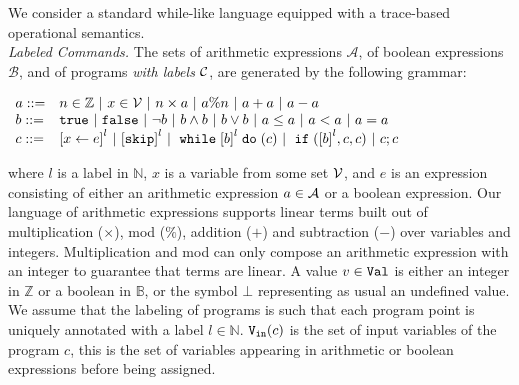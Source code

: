 We consider a standard while-like language equipped with a trace-based operational semantics.\\

\noindent\emph{Labeled Commands.}
The sets of arithmetic expressions $\mathcal{A}$, of boolean expressions $\mathcal{B}$, and  of programs \emph{with labels} $\mathcal{C}$, are generated by the following grammar:
\begin{center}
$
\begin{array}{ll}
\aexpr ::= &
n \in \mathbb{Z} ~|~ x \in \vardom ~|~ n \times \aexpr~|~ \aexpr \% n ~|~ \aexpr + \aexpr ~|~ \aexpr - \aexpr\\
\bexpr ::= & 
%
\etrue ~|~ \efalse  ~|~ \neg \bexpr
 ~|~ \bexpr \land \bexpr
%
~|~ \bexpr \lor \bexpr 
~|~ \aexpr \leq \aexpr 
~|~ \aexpr < \aexpr 
~|~ \aexpr = \aexpr \\
{c} ::= &
\clabel{\assign{x}{\expr}}^l 
~|~ \clabel{\eskip}^l
~|~ \ewhile \clabel{\bexpr}^{l} \edo ({c})
~|~ \eif(\clabel{\bexpr}^{l} , {c}, {c}) 
~|~ {c};{c} 
\end{array}
$
\end{center}
where $l$ is a label in $\mathbb{N}$, $x$ is a variable from
some set $\mathcal{V}$, and $e$ is an expression consisting of either an
arithmetic expression $a \in \mathcal{A}$ or a boolean
expression.
Our language of arithmetic expressions supports linear terms built out of  multiplication ($\times $), mod ($\%$), addition ($+$) and subtraction ($-$) over variables and integers. Multiplication and mod can only compose an arithmetic expression with an integer to guarantee that terms are linear. 
A value $v\in \mathtt{Val}$ is either an integer in $\mathbb{Z}$ or a boolean in $\mathbb{B}$, or the symbol $\bot$ representing as usual an undefined value.
We 
assume that the labeling of programs is such that each program
point is uniquely annotated with a label $l\in\mathbb{N}$.
${\mathtt{V_{\mathtt{in}}}}(c)$ is the set of input variables of the program $c$, this is the set of variables appearing in arithmetic or boolean expressions before being assigned.
%


